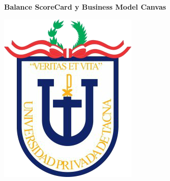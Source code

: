 \documentclass[10pt,a4paper]{article}
\begin{document}
		
		\begin{center}
			\huge \textbf{Balance ScoreCard y Business Model Canvas} 
		\end{center}
		\vspace{\baselineskip}
		\begin{center}
			\includegraphics[scale=0.37]{./Imagenes/logo}
		\end{center}
		\vspace{\baselineskip}
\end{document}
